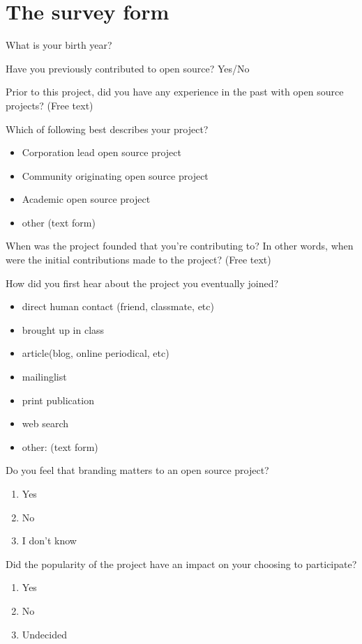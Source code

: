 \section{The survey form}
\label{app:survey_form}

What is your birth year?

Have you previously contributed to open source? Yes/No

Prior to this project, did you have any experience in the past with open source projects? (Free text)

Which of following best describes your project?
\begin{itemize}
\item Corporation lead open source project
\item Community originating open source project
\item Academic open source project
\item other (text form)
\end{itemize}
  
  
When was the project founded that you're contributing to? In other words, when were the initial contributions made to the project? (Free text)

How did you first hear about the project you eventually joined?
\begin{itemize}
\item direct human contact (friend, classmate, etc)
\item  brought up in class
\item article(blog, online periodical, etc)
\item mailinglist
\item print publication
\item web search
\item other: (text form)
\end{itemize}

Do you feel that branding matters to an open source project?
\begin{enumerate}
\item Yes
\item No
\item I don't know
\end{enumerate}

 Did the popularity of the project have an impact on your choosing to participate?
\begin{enumerate}
\item Yes
\item No
\item Undecided
\end{enumerate}

